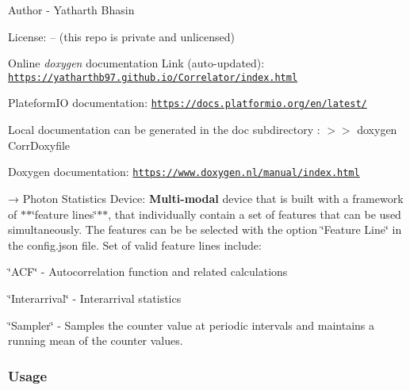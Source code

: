 Author -\/ Yatharth Bhasin

License\+: -- (this repo is private and unlicensed) 



Online {\itshape doxygen} documentation Link (auto-\/updated)\+: \href{https://yatharthb97.github.io/Correlator/index.html}{\tt https\+://yatharthb97.\+github.\+io/\+Correlator/index.\+html}

Plateform\+IO documentation\+: \href{https://docs.platformio.org/en/latest/}{\tt https\+://docs.\+platformio.\+org/en/latest/}

Local documentation can be generated in the {\ttfamily doc} subdirectory \+: {\ttfamily $>$$>$ doxygen Corr\+Doxyfile}

Doxygen documentation\+: \href{https://www.doxygen.nl/manual/index.html}{\tt https\+://www.\+doxygen.\+nl/manual/index.\+html} 



→ Photon Statistics Device\+: {\bfseries Multi-\/modal} device that is built with a framework of $\ast$$\ast$\char`\"{}feature lines\char`\"{}$\ast$$\ast$, that individually contain a set of features that can be used simultaneously. The features can be be selected with the option {\ttfamily \char`\"{}\+Feature Line\char`\"{}} in the {\ttfamily config.\+json} file. Set of valid feature lines include\+:


\begin{DoxyEnumerate}
\item {\ttfamily \char`\"{}\+A\+C\+F\char`\"{}} -\/ Autocorrelation function and related calculations
\item {\ttfamily \char`\"{}\+Interarrival\char`\"{}} -\/ Interarrival statistics
\item {\ttfamily \char`\"{}\+Sampler\char`\"{}} -\/ Samples the counter value at periodic intervals and maintains a running mean of the counter values.
\end{DoxyEnumerate}

\subsubsection*{Usage}


